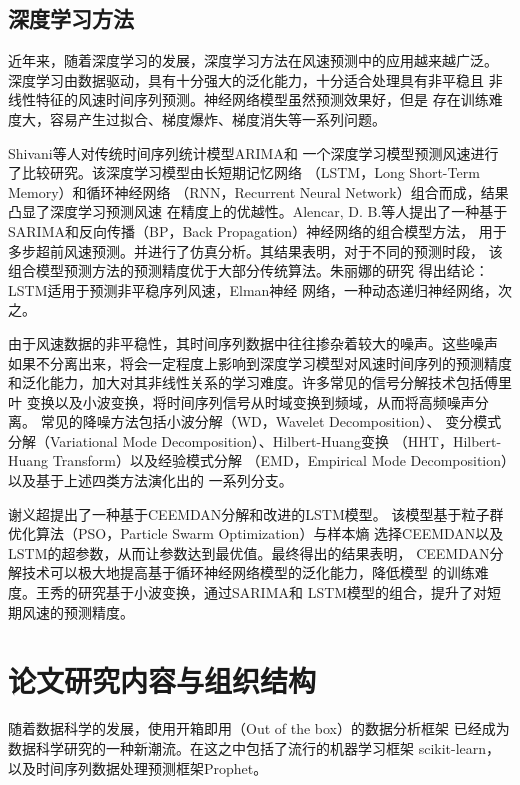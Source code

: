 \documentclass[AutoFakeBold]{LZUThesis}
\begin{document}
\subsection{深度学习方法}

近年来，随着深度学习的发展，深度学习方法在风速预测中的应用越来越广泛。
深度学习由数据驱动，具有十分强大的泛化能力，十分适合处理具有非平稳且
非线性特征的风速时间序列预测。神经网络模型虽然预测效果好，但是
存在训练难度大，容易产生过拟合、梯度爆炸、梯度消失等一系列问题。

Shivani等人对传统时间序列统计模型ARIMA和
一个深度学习模型预测风速进行了比较研究。该深度学习模型由长短期记忆网络
（LSTM，Long Short-Term Memory）和循环神经网络
（RNN，Recurrent Neural Network）组合而成，结果凸显了深度学习预测风速
在精度上的优越性。Alencar, D. B.等人提出了一种基于
SARIMA和反向传播（BP，Back Propagation）神经网络的组合模型方法，
用于多步超前风速预测。并进行了仿真分析。其结果表明，对于不同的预测时段，
该组合模型预测方法的预测精度优于大部分传统算法。朱丽娜的研究
得出结论：LSTM适用于预测非平稳序列风速，Elman神经
网络，一种动态递归神经网络，次之。

由于风速数据的非平稳性，其时间序列数据中往往掺杂着较大的噪声。这些噪声
如果不分离出来，将会一定程度上影响到深度学习模型对风速时间序列的预测精度
和泛化能力，加大对其非线性关系的学习难度。许多常见的信号分解技术包括傅里叶
变换以及小波变换，将时间序列信号从时域变换到频域，从而将高频噪声分离。
常见的降噪方法包括小波分解（WD，Wavelet Decomposition）、
变分模式分解（Variational Mode Decomposition）、Hilbert-Huang变换
（HHT，Hilbert-Huang Transform）以及经验模式分解
（EMD，Empirical Mode Decomposition）以及基于上述四类方法演化出的
一系列分支。

谢义超提出了一种基于CEEMDAN分解和改进的LSTM模型。
该模型基于粒子群优化算法（PSO，Particle Swarm Optimization）与样本熵
选择CEEMDAN以及LSTM的超参数，从而让参数达到最优值。最终得出的结果表明，
CEEMDAN分解技术可以极大地提高基于循环神经网络模型的泛化能力，降低模型
的训练难度。王秀的研究基于小波变换，通过SARIMA和
LSTM模型的组合，提升了对短期风速的预测精度。

\section{论文研究内容与组织结构}

随着数据科学的发展，使用开箱即用（Out of the box）的数据分析框架
已经成为数据科学研究的一种新潮流。在这之中包括了流行的机器学习框架
scikit-learn，以及时间序列数据处理预测框架Prophet。
\end{document}

